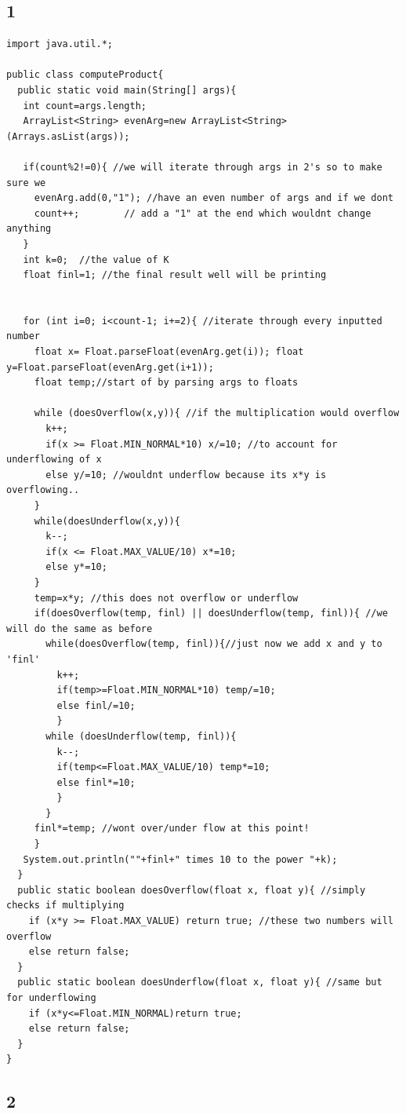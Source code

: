 \documentclass[12pt]{article}
\begin{document}
\subsection{1}
\begin{lstlisting}
import java.util.*;

public class computeProduct{
  public static void main(String[] args){
   int count=args.length;
   ArrayList<String> evenArg=new ArrayList<String>(Arrays.asList(args));
   
   if(count%2!=0){ //we will iterate through args in 2's so to make sure we 
     evenArg.add(0,"1"); //have an even number of args and if we dont
     count++;        // add a "1" at the end which wouldnt change anything 
   }
   int k=0;  //the value of K
   float finl=1; //the final result well will be printing
   
   
   for (int i=0; i<count-1; i+=2){ //iterate through every inputted number
     float x= Float.parseFloat(evenArg.get(i)); float y=Float.parseFloat(evenArg.get(i+1));  
     float temp;//start of by parsing args to floats 
     
     while (doesOverflow(x,y)){ //if the multiplication would overflow
       k++;
       if(x >= Float.MIN_NORMAL*10) x/=10; //to account for underflowing of x
       else y/=10; //wouldnt underflow because its x*y is overflowing..
     }
     while(doesUnderflow(x,y)){
       k--;
       if(x <= Float.MAX_VALUE/10) x*=10;
       else y*=10;
     }
     temp=x*y; //this does not overflow or underflow 
     if(doesOverflow(temp, finl) || doesUnderflow(temp, finl)){ //we will do the same as before
       while(doesOverflow(temp, finl)){//just now we add x and y to 'finl'
         k++;
         if(temp>=Float.MIN_NORMAL*10) temp/=10;
         else finl/=10;
         }
       while (doesUnderflow(temp, finl)){
         k--;
         if(temp<=Float.MAX_VALUE/10) temp*=10;
         else finl*=10;
         }
       }
     finl*=temp; //wont over/under flow at this point!
     }
   System.out.println(""+finl+" times 10 to the power "+k);
  }
  public static boolean doesOverflow(float x, float y){ //simply checks if multiplying
    if (x*y >= Float.MAX_VALUE) return true; //these two numbers will overflow
    else return false;
  }
  public static boolean doesUnderflow(float x, float y){ //same but for underflowing
    if (x*y<=Float.MIN_NORMAL)return true;
    else return false;
  }
}
\end{lstlisting}
\subsection{2}
\end{document}
